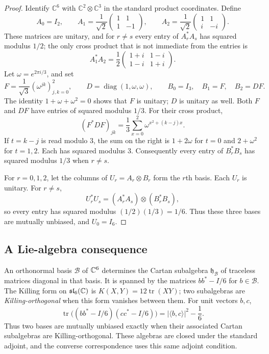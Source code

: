 \begin{proof}
Identify $\mathbb C^6$ with $\mathbb C^2\otimes\mathbb C^3$ in the standard
product coordinates. Define
\[
A_0=I_2,\qquad
A_1=\frac1{\sqrt2}\begin{pmatrix}1&1\\1&-1\end{pmatrix},\qquad
A_2=\frac1{\sqrt2}\begin{pmatrix}1&1\\i&-i\end{pmatrix}.
\]
These matrices are unitary, and for $r\ne s$ every entry of $A_r^*A_s$
has squared modulus $1/2$; the only cross product that is not immediate
from the entries is
\[
A_1^*A_2=\frac12\begin{pmatrix}1+i&1-i\\1-i&1+i\end{pmatrix}.
\]
Let $\omega=e^{2\pi i/3}$, and set
\[
F=\frac1{\sqrt3}(\omega^{jk})_{j,k=0}^{2},\qquad
D=\operatorname{diag}(1,\omega,\omega),\qquad
B_0=I_3,\quad B_1=F,\quad B_2=DF.
\]
The identity $1+\omega+\omega^2=0$ shows that $F$ is unitary; $D$ is
unitary as well. Both $F$ and $DF$ have entries of squared modulus $1/3$.
For their cross product,
\[
(F^*DF)_{jk}=\frac13\sum_{x=0}^{2}\omega^{x^2+(k-j)x}.
\]
If $t=k-j$ is read modulo $3$, the sum on the right is $1+2\omega$ for
$t=0$ and $2+\omega^2$ for $t=1,2$. Each has squared modulus $3$.
Consequently every entry of $B_r^*B_s$ has squared modulus $1/3$ when
$r\ne s$.

For $r=0,1,2$, let the columns of $U_r=A_r\otimes B_r$ form the $r$th
basis. Each $U_r$ is unitary. For $r\ne s$,
\[
U_r^*U_s=(A_r^*A_s)\otimes(B_r^*B_s),
\]
so every entry has squared modulus $(1/2)(1/3)=1/6$. Thus these three
bases are mutually unbiased, and $U_0=I_6$.
\end{proof}

\subsection{A Lie-algebra consequence}

An orthonormal basis $\mathcal B$ of $\mathbb C^6$ determines the Cartan
subalgebra $\mathfrak h_{\mathcal B}$ of traceless matrices diagonal
in that basis. It is spanned by the matrices $bb^*-I/6$ for
$b\in\mathcal B$. The Killing form on $\mathfrak{sl}_6(\mathbb C)$ is
$K(X,Y)=12\operatorname{tr}(XY)$; two subalgebras are
\emph{Killing-orthogonal} when this form vanishes between them. For
unit vectors $b,c$,
\[
 \operatorname{tr}\bigl((bb^*-I/6)(cc^*-I/6)\bigr)
 =|\langle b,c\rangle|^2-\frac16.
\]
Thus two bases are mutually unbiased exactly when their associated
Cartan subalgebras are Killing-orthogonal. These algebras are closed
under the standard adjoint, and the converse correspondence uses this
same adjoint condition.


